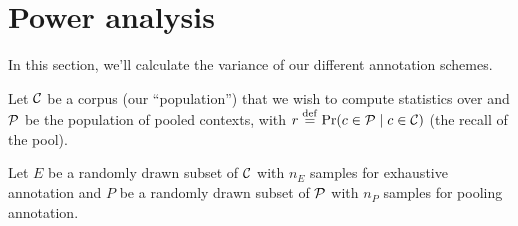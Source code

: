 \onecolumn
\section{Power analysis}
\label{sec:power}

In this section, we'll calculate the variance of our different annotation schemes.

\newcommand{\xh}{\hat{x}}
\newcommand{\xb}{\bar{x}}
\newcommand{\yh}{\hat{y}}
\newcommand{\yb}{\bar{y}}
\newcommand{\rh}{\hat{r}}
\newcommand{\ph}{\hat{p}}

Let $\mathcal{C}$ be a corpus (our ``population'') that we wish to compute statistics over
and $\mathcal{P}$ be the population of pooled contexts, 
  with $r \stackrel{\rm def}{=} \Pr(c \in \mathcal{P} \mid c \in \mathcal{C})$ (the recall of the pool).

Let $E$ be a randomly drawn subset of $\mathcal{C}$ with $n_E$ samples for exhaustive annotation and
    $P$ be a randomly drawn subset of $\mathcal{P}$ with $n_P$ samples for pooling annotation.

